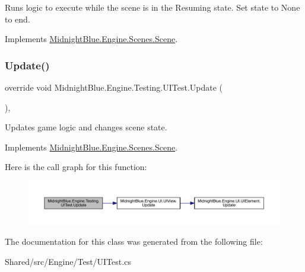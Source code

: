 Runs logic to execute while the scene is in the Resuming state. Set state to None to end. 



Implements \hyperlink{class_midnight_blue_1_1_engine_1_1_scenes_1_1_scene_ab7cd837b20785116007a4732d90bc548}{Midnight\+Blue.\+Engine.\+Scenes.\+Scene}.

\hypertarget{class_midnight_blue_1_1_engine_1_1_testing_1_1_u_i_test_a9866becb1e9b6bf9b9edb0f732b46250}{}\label{class_midnight_blue_1_1_engine_1_1_testing_1_1_u_i_test_a9866becb1e9b6bf9b9edb0f732b46250} 
\subsubsection{\texorpdfstring{Update()}{Update()}}
{\footnotesize\ttfamily override void Midnight\+Blue.\+Engine.\+Testing.\+U\+I\+Test.\+Update (\begin{DoxyParamCaption}{ }\end{DoxyParamCaption})\hspace{0.3cm}{\ttfamily [inline]}, {\ttfamily [virtual]}}



Updates game logic and changes scene state. 



Implements \hyperlink{class_midnight_blue_1_1_engine_1_1_scenes_1_1_scene_a4e37ff3d5362a8ad5c0d82d7c990dfdf}{Midnight\+Blue.\+Engine.\+Scenes.\+Scene}.

Here is the call graph for this function\+:
\nopagebreak
\begin{figure}[H]
\begin{center}
\leavevmode
\includegraphics[width=350pt]{class_midnight_blue_1_1_engine_1_1_testing_1_1_u_i_test_a9866becb1e9b6bf9b9edb0f732b46250_cgraph}
\end{center}
\end{figure}


The documentation for this class was generated from the following file\+:\begin{DoxyCompactItemize}
\item 
Shared/src/\+Engine/\+Test/U\+I\+Test.\+cs\end{DoxyCompactItemize}
